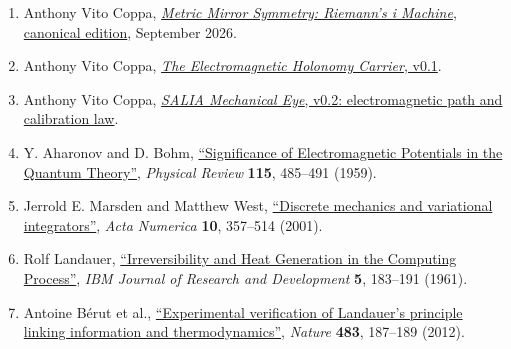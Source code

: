 \begin{enumerate}
\item
  Anthony Vito Coppa, \href{https://github.com/Coppalini-Architecture/coppalini-architecture/blob/9b7122ca5c3712c2c294e2bc5097276d0ba9817b/papers/metric-mirror-symmetry-riemanns-i-machine/metric-mirror-symmetry-riemanns-i-machine-2026-09-09.pdf}{\emph{Metric Mirror Symmetry: Riemann's i Machine}, canonical edition}, September 2026.
\item
  Anthony Vito Coppa, \href{https://chatgpt.com/library?file_id=libfile_c8b01c25977c8191821c6dddbe16e0da\&account_id=personal}{\emph{The Electromagnetic Holonomy Carrier}, v0.1}.
\item
  Anthony Vito Coppa, \href{https://chatgpt.com/library?file_id=libfile_b30993b2ecd48191aab2855fdb3d932e\&account_id=personal}{\emph{SALIA Mechanical Eye}, v0.2: electromagnetic path and calibration law}.
\item
  Y. Aharonov and D. Bohm, \href{https://doi.org/10.1103/PhysRev.115.485}{``Significance of Electromagnetic Potentials in the Quantum Theory''}, \emph{Physical Review} \textbf{115}, 485--491 (1959).
\item
  Jerrold E. Marsden and Matthew West, \href{https://doi.org/10.1017/S096249290100006X}{``Discrete mechanics and variational integrators''}, \emph{Acta Numerica} \textbf{10}, 357--514 (2001).
\item
  Rolf Landauer, \href{https://doi.org/10.1147/RD.53.0183}{``Irreversibility and Heat Generation in the Computing Process''}, \emph{IBM Journal of Research and Development} \textbf{5}, 183--191 (1961).
\item
  Antoine Bérut et al., \href{https://doi.org/10.1038/nature10872}{``Experimental verification of Landauer's principle linking information and thermodynamics''}, \emph{Nature} \textbf{483}, 187--189 (2012).
\end{enumerate}
